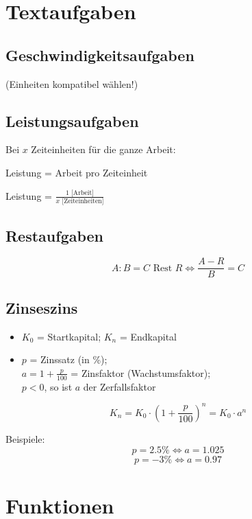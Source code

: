 \begin{multicols}{2}
\forceCB

\section*{Textaufgaben}
\subsection*{Geschwindigkeitsaufgaben}
 (Einheiten kompatibel wählen!)

\subsection*{Leistungsaufgaben}
Bei $x$ Zeiteinheiten für die ganze Arbeit:

Leistung = Arbeit pro Zeiteinheit

Leistung = $\frac{1 \textrm{ [Arbeit]}}{x \textrm{ [Zeiteinheiten]}}$


\subsection*{Restaufgaben}
$$A:B = C \textrm{ Rest } R \Leftrightarrow{}\frac{A-R}B=C$$


\subsection*{Zinseszins}
\begin{itemize}
\item $K_0$ = Startkapital; $K_n$ = Endkapital
\item $p$ = Zinssatz (in \%);\\ $a = 1+\frac{p}{100}$ = Zinsfaktor
(Wachstumsfaktor);\\ $p<0$, so ist $a$ der Zerfallsfaktor
\end{itemize}
$$K_n = K_0 \cdot{} \left( 1+\frac{p}{100} \right)^n = K_0\cdot{}a^n$$

Beispiele:
$$p = 2.5\% \Longleftrightarrow{} a = 1.025$$
$$p = -3\% \Longleftrightarrow{}  a = 0.97 $$


\forceCB
\section*{Funktionen}


\end{multicols}
